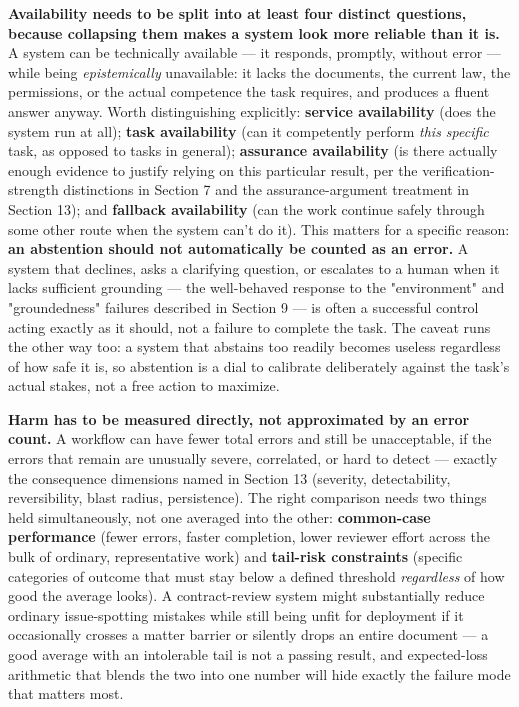 \textbf{Availability needs to be split into at least four distinct questions, because collapsing them makes a system look more reliable than it is.} A system can be technically available --- it responds, promptly, without error --- while being \emph{epistemically} unavailable: it lacks the documents, the current law, the permissions, or the actual competence the task requires, and produces a fluent answer anyway. Worth distinguishing explicitly: \textbf{service availability} (does the system run at all); \textbf{task availability} (can it competently perform \emph{this specific} task, as opposed to tasks in general); \textbf{assurance availability} (is there actually enough evidence to justify relying on this particular result, per the verification-strength distinctions in Section 7 and the assurance-argument treatment in Section 13); and \textbf{fallback availability} (can the work continue safely through some other route when the system can't do it). This matters for a specific reason: \textbf{an abstention should not automatically be counted as an error.} A system that declines, asks a clarifying question, or escalates to a human when it lacks sufficient grounding --- the well-behaved response to the "environment" and "groundedness" failures described in Section 9 --- is often a successful control acting exactly as it should, not a failure to complete the task. The caveat runs the other way too: a system that abstains too readily becomes useless regardless of how safe it is, so abstention is a dial to calibrate deliberately against the task's actual stakes, not a free action to maximize.

\textbf{Harm has to be measured directly, not approximated by an error count.} A workflow can have fewer total errors and still be unacceptable, if the errors that remain are unusually severe, correlated, or hard to detect --- exactly the consequence dimensions named in Section 13 (severity, detectability, reversibility, blast radius, persistence). The right comparison needs two things held simultaneously, not one averaged into the other: \textbf{common-case performance} (fewer errors, faster completion, lower reviewer effort across the bulk of ordinary, representative work) and \textbf{tail-risk constraints} (specific categories of outcome that must stay below a defined threshold \emph{regardless} of how good the average looks). A contract-review system might substantially reduce ordinary issue-spotting mistakes while still being unfit for deployment if it occasionally crosses a matter barrier or silently drops an entire document --- a good average with an intolerable tail is not a passing result, and expected-loss arithmetic that blends the two into one number will hide exactly the failure mode that matters most.

